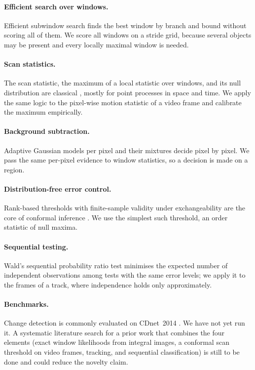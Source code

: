 \documentclass[11pt,a4paper]{article}
\theoremstyle{definition}
\begin{document}
\paragraph{Efficient search over windows.}
Efficient subwindow search \cite{lampert2008} finds the best window by branch and bound without scoring all of them.
We score all windows on a stride grid, because several objects may be present and every locally maximal window is needed.

\paragraph{Scan statistics.}
The scan statistic, the maximum of a local statistic over windows, and its null distribution are classical \cite{naus1965,kulldorff1997,glaz2001}, mostly for point processes in space and time.
We apply the same logic to the pixel-wise motion statistic of a video frame and calibrate the maximum empirically.

\paragraph{Background subtraction.}
Adaptive Gaussian models per pixel and their mixtures \cite{stauffer1999} decide pixel by pixel.
We pass the same per-pixel evidence to window statistics, so a decision is made on a region.

\paragraph{Distribution-free error control.}
Rank-based thresholds with finite-sample validity under exchangeability are the core of conformal inference \cite{vovk2005,lei2018}.
We use the simplest such threshold, an order statistic of null maxima.

\paragraph{Sequential testing.}
Wald's sequential probability ratio test \cite{wald1945} minimises the expected number of independent observations among tests with the same error levels; we apply it to the frames of a track, where independence holds only approximately.

\paragraph{Benchmarks.}
Change detection is commonly evaluated on CDnet~2014 \cite{goyette2012}.
We have not yet run it.
A systematic literature search for a prior work that combines the four elements (exact window likelihoods from integral images, a conformal scan threshold on video frames, tracking, and sequential classification) is still to be done and could reduce the novelty claim.
\end{document}
